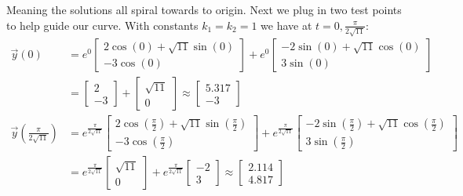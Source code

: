 \documentclass{article}
\begin{document}
Meaning the solutions all spiral towards to origin. Next we plug in two test points to help guide our curve. With constants $k_1=k_2=1$ we have at $t=0,\frac{\pi}{2\sqrt{11}}$:
\begin{align*}
  \vec y(0)&=e^0\begin{bmatrix}
    2\cos(0)+\sqrt{11}\sin(0)\\-3\cos(0)
  \end{bmatrix}+e^0\begin{bmatrix}
    -2\sin(0)+\sqrt{11}\cos(0)\\3\sin(0)
  \end{bmatrix}\\
  &=\begin{bmatrix}
    2\\-3
  \end{bmatrix}+\begin{bmatrix}
    \sqrt{11}\\0
  \end{bmatrix}\approx\begin{bmatrix}
    5.317\\-3
  \end{bmatrix}\\
  \vec y\left(\frac{\pi}{2\sqrt{11}}\right)&=e^{\frac{\pi}{2\sqrt{11}}}\begin{bmatrix}
    2\cos\left(\frac{\pi}{2}\right)+\sqrt{11}\sin\left(\frac{\pi}{2}\right)\\-3\cos\left(\frac{\pi}{2}\right)
  \end{bmatrix}+e^{\frac{\pi}{2\sqrt{11}}}\begin{bmatrix}
    -2\sin\left(\frac{\pi}{2}\right)+\sqrt{11}\cos\left(\frac{\pi}{2}\right)\\3\sin\left(\frac{\pi}{2}\right)
  \end{bmatrix}\\
  &=e^{\frac{\pi}{2\sqrt{11}}}\begin{bmatrix}
    \sqrt{11}\\0
  \end{bmatrix}+e^{\frac{\pi}{2\sqrt{11}}}\begin{bmatrix}
    -2\\3
  \end{bmatrix}\approx\begin{bmatrix}
    2.114\\4.817
  \end{bmatrix}
\end{align*}
\end{document}
